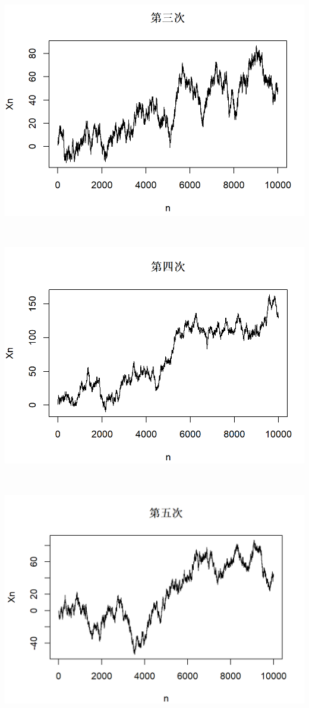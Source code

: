 \documentclass{article}
\begin{document}
\begin{CJK}{UTF8}{gbsn}
\begin{minipage}{0.5\textwidth}
    \includegraphics[scale=0.6]{random3.png}
\end{minipage}
\\
\begin{minipage}{0.5\textwidth}
    \includegraphics[scale=0.6]{random4.png}
\end{minipage}
\\
\begin{minipage}{0.5\textwidth}
    \includegraphics[scale=0.6]{random5.png}

\end{minipage}
\end{CJK}
\end{document}
